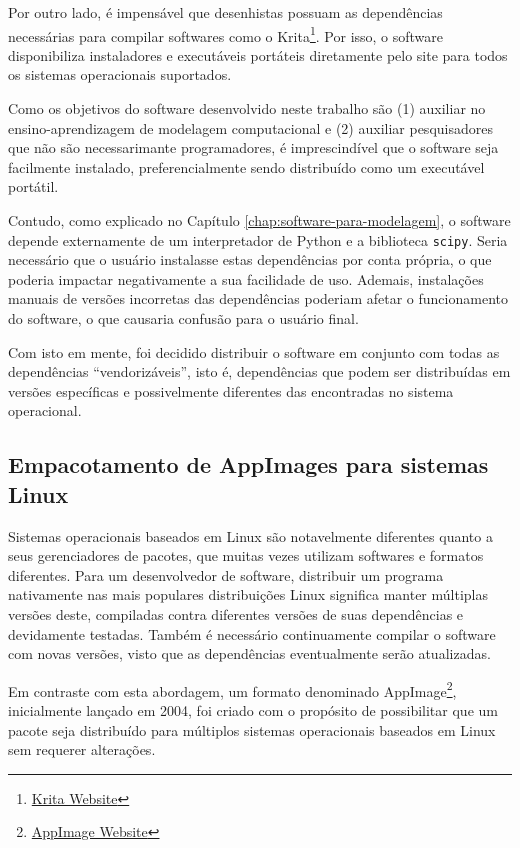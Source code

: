 \documentclass[
	12pt,				%
	openright,			%
	oneside,			%
	a4paper,			%
	main=brazil,
	english,			%
	]{ufsj-abntex2}
\begin{document}
Por outro lado, é impensável que desenhistas possuam as dependências necessárias para compilar softwares como o Krita\footnote{\href{https://krita.org/en/}{Krita Website}}. Por isso, o software disponibiliza instaladores e executáveis portáteis diretamente pelo site para todos os sistemas operacionais suportados.

Como os objetivos do software desenvolvido neste trabalho são (1) auxiliar no ensino-aprendizagem de modelagem computacional e (2) auxiliar pesquisadores que não são necessarimante programadores, é imprescindível que o software seja facilmente instalado, preferencialmente sendo distribuído como um executável portátil.

Contudo, como explicado no Capítulo \ref{chap:software-para-modelagem}, o software depende externamente de um interpretador de Python e a biblioteca \texttt{scipy}. Seria necessário que o usuário instalasse estas dependências por conta própria, o que poderia impactar negativamente a sua facilidade de uso. Ademais, instalações manuais de versões incorretas das dependências poderiam afetar o funcionamento do software, o que causaria confusão para o usuário final.

Com isto em mente, foi decidido distribuir o software em conjunto com todas as dependências ``vendorizáveis'', isto é, dependências que podem ser distribuídas em versões específicas e possivelmente diferentes das encontradas no sistema operacional.

\subsection{Empacotamento de AppImages para sistemas Linux}

Sistemas operacionais baseados em Linux são notavelmente diferentes quanto a seus gerenciadores de pacotes, que muitas vezes utilizam softwares e formatos diferentes. Para um desenvolvedor de software, distribuir um programa nativamente nas mais populares distribuições Linux significa manter múltiplas versões deste, compiladas contra diferentes versões de suas dependências e devidamente testadas. Também é necessário continuamente compilar o software com novas versões, visto que as dependências eventualmente serão atualizadas.

Em contraste com esta abordagem, um formato denominado AppImage\footnote{\href{https://appimage.org/}{AppImage Website}}, inicialmente lançado em 2004, foi criado com o propósito de possibilitar que um pacote seja distribuído para múltiplos sistemas operacionais baseados em Linux sem requerer alterações.
\end{document}
